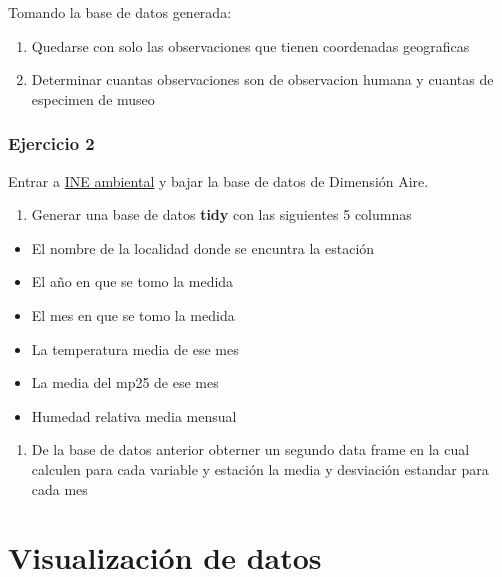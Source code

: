 \documentclass[]{book}
\providecommand{\tightlist}{%
  \setlength{\itemsep}{0pt}\setlength{\parskip}{0pt}}
\begin{document}
Tomando la base de datos generada:

\begin{enumerate}
\def\labelenumi{\alph{enumi}.}
\item
  Quedarse con solo las observaciones que tienen coordenadas geograficas
\item
  Determinar cuantas observaciones son de observacion humana y cuantas
  de especimen de museo
\end{enumerate}

\hypertarget{ejercicio-2-1}{%
\subsection{Ejercicio 2}\label{ejercicio-2-1}}

Entrar a
\href{http://www.ine.cl/estadisticas/medioambiente/series-cronologicas-vba}{INE
ambiental} y bajar la base de datos de Dimensión Aire.

\begin{enumerate}
\def\labelenumi{\alph{enumi}.}
\tightlist
\item
  Generar una base de datos \textbf{tidy} con las siguientes 5 columnas
\end{enumerate}

\begin{itemize}
\tightlist
\item
  El nombre de la localidad donde se encuntra la estación
\item
  El año en que se tomo la medida
\item
  El mes en que se tomo la medida
\item
  La temperatura media de ese mes
\item
  La media del mp25 de ese mes
\item
  Humedad relativa media mensual
\end{itemize}

\begin{enumerate}
\def\labelenumi{\alph{enumi}.}
\setcounter{enumi}{1}
\tightlist
\item
  De la base de datos anterior obterner un segundo data frame en la cual
  calculen para cada variable y estación la media y desviación estandar
  para cada mes
\end{enumerate}

\hypertarget{visualizacion}{%
\chapter{Visualización de datos}\label{visualizacion}}
\end{document}
